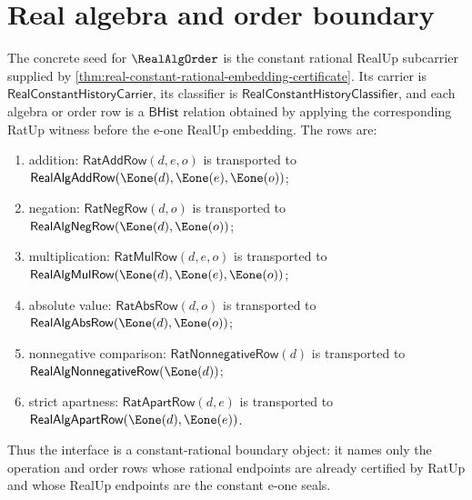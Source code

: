 \section{Real algebra and order boundary}
\label{sec:realalgorder-concrete-interface}

\begin{definition}
\label{def:realalgorder-concrete-interface}
The concrete seed for $\RealAlgOrder$ is the constant rational RealUp
subcarrier supplied by
\autoref{thm:real-constant-rational-embedding-certificate}. Its carrier is
$\mathsf{RealConstantHistoryCarrier}$, its classifier is
$\mathsf{RealConstantHistoryClassifier}$, and each algebra or order row is a
$\mathsf{BHist}$ relation obtained by applying the corresponding RatUp witness
before the e-one RealUp embedding. The rows are:
\begin{enumerate}
  \item addition:
  $\mathsf{RatAddRow}(d,e,o)$ is transported to
  $\mathsf{RealAlgAddRow}(\Eone(d),\Eone(e),\Eone(o))$;
  \item negation:
  $\mathsf{RatNegRow}(d,o)$ is transported to
  $\mathsf{RealAlgNegRow}(\Eone(d),\Eone(o))$;
  \item multiplication:
  $\mathsf{RatMulRow}(d,e,o)$ is transported to
  $\mathsf{RealAlgMulRow}(\Eone(d),\Eone(e),\Eone(o))$;
  \item absolute value:
  $\mathsf{RatAbsRow}(d,o)$ is transported to
  $\mathsf{RealAlgAbsRow}(\Eone(d),\Eone(o))$;
  \item nonnegative comparison:
  $\mathsf{RatNonnegativeRow}(d)$ is transported to
  $\mathsf{RealAlgNonnegativeRow}(\Eone(d))$;
  \item strict apartness:
  $\mathsf{RatApartRow}(d,e)$ is transported to
  $\mathsf{RealAlgApartRow}(\Eone(d),\Eone(e))$.
\end{enumerate}
Thus the interface is a constant-rational boundary object: it names only the
operation and order rows whose rational endpoints are already certified by
RatUp and whose RealUp endpoints are the constant e-one seals.
\end{definition}

